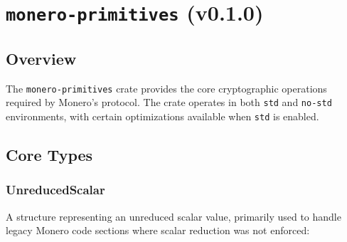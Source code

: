 \documentclass[12pt,a4paper]{article}
\begin{document}




\section{\texttt{monero-primitives} (v0.1.0)}

\subsection{Overview}
The \texttt{monero-primitives} crate provides the core cryptographic operations required by Monero's protocol.  The crate operates in both \texttt{std} and \texttt{no-std} environments, with certain optimizations available when \texttt{std} is enabled.

\subsection{Core Types}

\subsubsection{UnreducedScalar}
A structure representing an unreduced scalar value, primarily used to handle legacy Monero code sections where scalar reduction was not enforced: %
\end{document}
